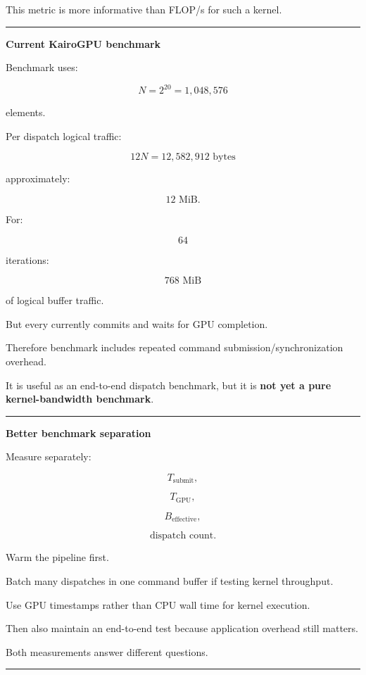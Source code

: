 This metric is more informative than FLOP/s for such a kernel.

\begin{center}\rule{0.5\linewidth}{0.5pt}\end{center}

\textbf{Current KairoGPU benchmark}

Benchmark uses:

\[
N=2^{20}
=
1,048,576
\]

elements.

Per dispatch logical traffic:

\[
12N
=
12,582,912\text{ bytes}
\]

approximately:

\[
12\text{ MiB}.
\]

For:

\[
64
\]

iterations:

\[
768\text{ MiB}
\]

of logical buffer traffic.

But every  currently commits and waits for GPU completion.

Therefore benchmark includes repeated command submission/synchronization overhead.

It is useful as an end-to-end dispatch benchmark, but it is \textbf{not yet a pure kernel-bandwidth benchmark}.

\begin{center}\rule{0.5\linewidth}{0.5pt}\end{center}

\textbf{Better benchmark separation}

Measure separately:

\[
T_{\text{submit}},
\]

\[
T_{\text{GPU}},
\]

\[
B_{\text{effective}},
\]

\[
\text{dispatch count}.
\]

Warm the pipeline first.

Batch many dispatches in one command buffer if testing kernel throughput.

Use GPU timestamps rather than CPU wall time for kernel execution.

Then also maintain an end-to-end test because application overhead still matters.

Both measurements answer different questions.

\begin{center}\rule{0.5\linewidth}{0.5pt}\end{center}

